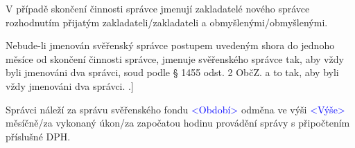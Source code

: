\documentclass[parskip=half]{scrreprt}
\begin{document}
\begin{contract}
V případě skončení činnosti správce jmenují zakladatelé nového správce rozhodnutím přijatým zakladateli/zakladateli a obmyšlenými/obmyšlenými.

Nebude-li jmenován svěřenský správce postupem uvedeným shora do jednoho měsíce od skončení činnosti správce, jmenuje svěřenského správce tak, aby vždy byli jmenováni dva správci, soud podle § 1455 odst. 2 ObčZ. a to tak, aby byli vždy jmenováni dva správci.
.]
\parnumbertrue


Správci náleží za správu svěřenského fondu \textcolor{blue}{<Období>} odměna ve výši \textcolor{blue}{<Výše>} měsíčně/za vykonaný úkon/za započatou hodinu provádění správy s připočtením příslušné DPH.










\end{contract}
\end{document}
